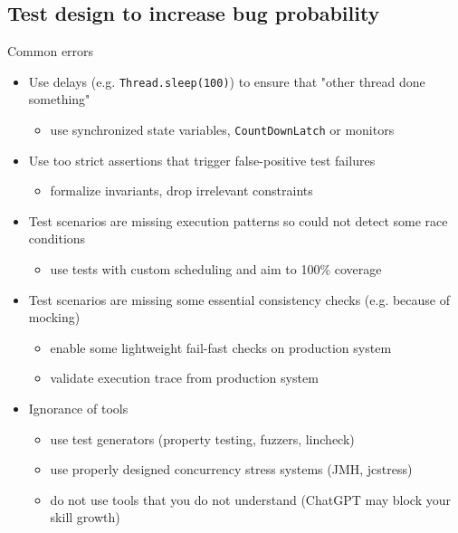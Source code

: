 

\subsection{Test design to increase bug probability}
\showTOCSub

\begin{frame}{Common errors}

\pause
\begin{itemize}
  \item Use delays (e.g. \texttt{Thread.sleep(100)}) to ensure that "other thread done something"
  \begin{itemize}
    \item use synchronized state variables, \texttt{CountDownLatch} or monitors
  \end{itemize}

  \pause
  \item Use too strict assertions that trigger false-positive test failures
  \begin{itemize}
    \item formalize invariants, drop irrelevant constraints
  \end{itemize}

  \pause
  \item Test scenarios are missing execution patterns so could not detect some race conditions
  \begin{itemize}
    \item use tests with custom scheduling and aim to 100\% coverage
  \end{itemize}

  \pause
  \item Test scenarios are missing some essential consistency checks (e.g. because of mocking)
  \begin{itemize}
    \item enable some lightweight fail-fast checks on production system
    \item validate execution trace from production system
  \end{itemize}

  \pause
  \item Ignorance of tools
  \begin{itemize}
    \item use test generators (property testing, fuzzers, lincheck)
    \item use properly designed concurrency stress systems (JMH, jcstress)
    \item do not use tools that you do not understand \pause(ChatGPT may block your skill growth)
  \end{itemize}


\end{itemize}
\end{frame}
